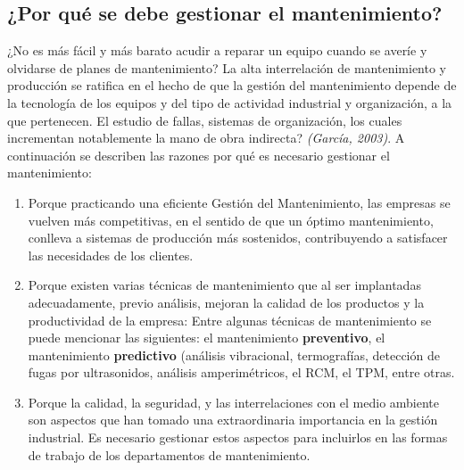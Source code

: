 \documentclass[
	12pt, %
	fleqn, %
	a4paper, %
	oneside, %
]{LegrandOrangeBook}
\begin{document}
\subsection{¿Por qué se debe gestionar el mantenimiento?}
¿No es más fácil y más barato acudir a reparar un equipo cuando se averíe y olvidarse de planes de mantenimiento? La alta interrelación de mantenimiento y producción se ratifica en el hecho de que la gestión del mantenimiento depende de la tecnología de los equipos y del tipo de actividad industrial y organización, a la que pertenecen. El estudio de fallas, sistemas de organización, los cuales incrementan notablemente la mano de obra indirecta? \textit{(García, 2003)}. A continuación se describen las razones por qué es necesario gestionar el mantenimiento:
\begin{enumerate}
\item Porque practicando una eficiente Gestión del Mantenimiento, las empresas se vuelven más competitivas, en el sentido de que un óptimo mantenimiento, conlleva a sistemas de producción más sostenidos, contribuyendo a satisfacer las necesidades de los clientes.
\item Porque existen varias técnicas de mantenimiento que al ser implantadas adecuadamente, previo análisis, mejoran la calidad de los productos y la productividad de la empresa: Entre algunas técnicas de mantenimiento se puede mencionar las siguientes: el mantenimiento \textbf{preventivo}, el mantenimiento \textbf{predictivo} (análisis vibracional, termografías, detección de fugas por ultrasonidos, análisis amperimétricos, el RCM, el TPM, entre otras.
\item Porque la calidad, la seguridad, y las interrelaciones con el medio ambiente son aspectos que han tomado una extraordinaria importancia en la gestión industrial. Es necesario gestionar estos aspectos para incluirlos en las formas de trabajo de los departamentos de mantenimiento.
\end{enumerate}
\end{document}
